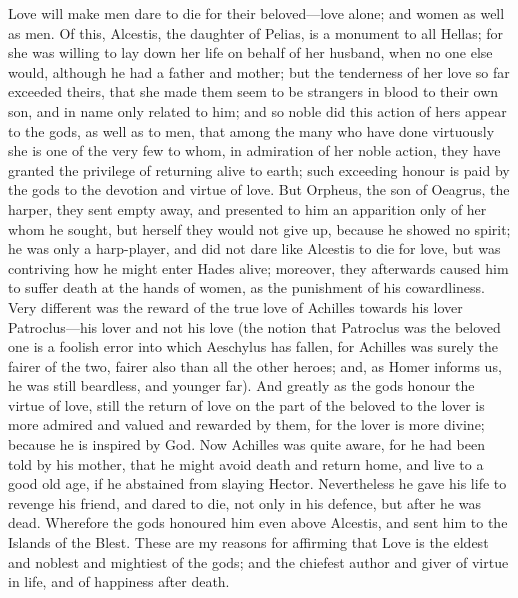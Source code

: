 \documentclass[11pt,letter]{article}
\begin{document}
\par  Love will make men dare to die for their beloved—love alone; and women as well as men. Of this, Alcestis, the daughter of Pelias, is a monument to all Hellas; for she was willing to lay down her life on behalf of her husband, when no one else would, although he had a father and mother; but the tenderness of her love so far exceeded theirs, that she made them seem to be strangers in blood to their own son, and in name only related to him; and so noble did this action of hers appear to the gods, as well as to men, that among the many who have done virtuously she is one of the very few to whom, in admiration of her noble action, they have granted the privilege of returning alive to earth; such exceeding honour is paid by the gods to the devotion and virtue of love. But Orpheus, the son of Oeagrus, the harper, they sent empty away, and presented to him an apparition only of her whom he sought, but herself they would not give up, because he showed no spirit; he was only a harp-player, and did not dare like Alcestis to die for love, but was contriving how he might enter Hades alive; moreover, they afterwards caused him to suffer death at the hands of women, as the punishment of his cowardliness. Very different was the reward of the true love of Achilles towards his lover Patroclus—his lover and not his love (the notion that Patroclus was the beloved one is a foolish error into which Aeschylus has fallen, for Achilles was surely the fairer of the two, fairer also than all the other heroes; and, as Homer informs us, he was still beardless, and younger far). And greatly as the gods honour the virtue of love, still the return of love on the part of the beloved to the lover is more admired and valued and rewarded by them, for the lover is more divine; because he is inspired by God. Now Achilles was quite aware, for he had been told by his mother, that he might avoid death and return home, and live to a good old age, if he abstained from slaying Hector. Nevertheless he gave his life to revenge his friend, and dared to die, not only in his defence, but after he was dead. Wherefore the gods honoured him even above Alcestis, and sent him to the Islands of the Blest. These are my reasons for affirming that Love is the eldest and noblest and mightiest of the gods; and the chiefest author and giver of virtue in life, and of happiness after death.
\end{document}
